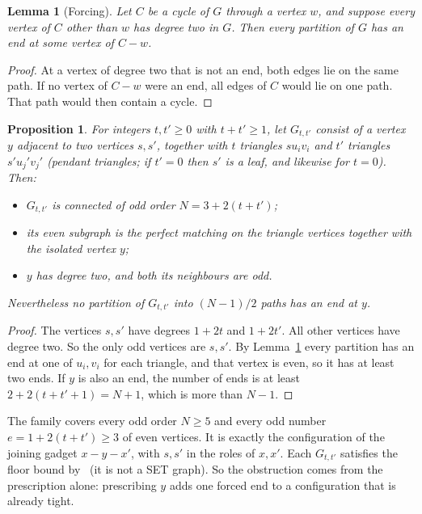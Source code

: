 \documentclass[11pt]{amsart}
\newtheorem{lemma}[theorem]{Lemma}
\newtheorem{proposition}[theorem]{Proposition}
\theoremstyle{definition}
\begin{document}
\begin{lemma}[Forcing]\label{lem:forcing}
Let $C$ be a cycle of $G$ through a vertex $w$, and suppose every vertex of $C$ other than $w$ has
degree two in $G$. Then every partition of $G$ has an end at some vertex of $C-w$.
\end{lemma}

\begin{proof}
At a vertex of degree two that is not an end, both edges lie on the same path. If no vertex of
$C-w$ were an end, all edges of $C$ would lie on one path. That path would then contain a cycle.
\end{proof}

\begin{proposition}\label{prop:family}
For integers $t,t'\ge0$ with $t+t'\ge1$, let $G_{t,t'}$ consist of a vertex $y$ adjacent to two
vertices $s,s'$, together with $t$ triangles $su_iv_i$ and $t'$ triangles $s'u_j'v_j'$ (pendant
triangles; if $t'=0$ then $s'$ is a leaf, and likewise for $t=0$). Then:
\begin{itemize}
\item $G_{t,t'}$ is connected of odd order $N=3+2(t+t')$;
\item its even subgraph is the perfect matching on the triangle vertices together with the
isolated vertex $y$;
\item $y$ has degree two, and both its neighbours are odd.
\end{itemize}
Nevertheless no partition of $G_{t,t'}$ into $(N-1)/2$ paths has an end at $y$.
\end{proposition}

\begin{proof}
The vertices $s,s'$ have degrees $1+2t$ and $1+2t'$. All other vertices have degree two. So the
only odd vertices are $s,s'$. By Lemma~\ref{lem:forcing} every partition has an end at one of $u_i,v_i$
for each triangle, and that vertex is even, so it has at least two ends. If $y$ is also an end, the
number of ends is at least $2+2(t+t'+1)=N+1$, which is more than $N-1$.
\end{proof}

The family covers every odd order $N\ge5$ and every odd number $e=1+2(t+t')\ge3$ of even vertices.
It is exactly the configuration of the joining gadget $x-y-x'$, with $s,s'$ in the roles of $x,x'$.
Each $G_{t,t'}$ satisfies the floor bound by~\cite[Theorem~13]{BS} (it is not a SET graph). So the
obstruction comes from the prescription alone: prescribing $y$ adds one forced end to a
configuration that is already tight.
\end{document}
